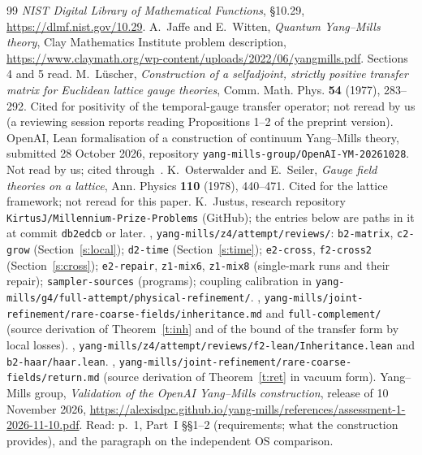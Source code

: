\begin{thebibliography}{99}
 \emph{NIST Digital Library of Mathematical Functions}, \S10.29, \url{https://dlmf.nist.gov/10.29}.
 A.~Jaffe and E.~Witten, \emph{Quantum Yang--Mills theory}, Clay Mathematics Institute problem
description, \url{https://www.claymath.org/wp-content/uploads/2022/06/yangmills.pdf}. Sections 4 and 5 read.
 M.~L\"uscher, \emph{Construction of a selfadjoint, strictly positive transfer matrix for
Euclidean lattice gauge theories}, Comm. Math. Phys. \textbf{54} (1977), 283--292. Cited for positivity of the
temporal-gauge transfer operator; not reread by us (a reviewing session reports reading Propositions 1--2 of
the preprint version).
 OpenAI, Lean formalisation of a construction of continuum Yang--Mills theory, submitted
28 October 2026, repository \texttt{yang-mills-group/OpenAI-YM-20261028}. Not read by us; cited through~\cite{YMG}.
 K.~Osterwalder and E.~Seiler, \emph{Gauge field theories on a lattice}, Ann. Physics
\textbf{110} (1978), 440--471. Cited for the lattice framework; not reread for this paper.
 K.~Justus, research repository \texttt{KirtusJ/Millennium-Prize-Problems} (GitHub); the
entries below are paths in it at commit \texttt{db2edcb} or later.
 \cite{Repo}, \texttt{yang-mills/z4/attempt/reviews/}: \texttt{b2-matrix}, \texttt{c2-grow}
(Section~\ref{s:local}); \texttt{d2-time} (Section~\ref{s:time}); \texttt{e2-cross}, \texttt{f2-cross2}
(Section~\ref{s:cross}); \texttt{e2-repair}, \texttt{z1-mix6}, \texttt{z1-mix8} (single-mark runs and their
repair); \texttt{sampler-sources} (programs); coupling calibration in
\texttt{yang-mills/g4/full-attempt/physical-refinement/}.
 \cite{Repo}, \texttt{yang-mills/joint-refinement/rare-coarse-fields/inheritance.md} and
\texttt{full-complement/} (source derivation of Theorem~\ref{t:inh} and of the bound of the transfer form by
local losses).
 \cite{Repo}, \texttt{yang-mills/z4/attempt/reviews/f2-lean/Inheritance.lean} and
\texttt{b2-haar/haar.lean}.
 \cite{Repo}, \texttt{yang-mills/joint-refinement/rare-coarse-fields/return.md} (source
derivation of Theorem~\ref{t:ret} in vacuum form).
 Yang--Mills group, \emph{Validation of the OpenAI Yang--Mills construction}, release of
10 November 2026, \url{https://alexisdpc.github.io/yang-mills/references/assessment-1-2026-11-10.pdf}. Read:
p.~1, Part~I \S\S1--2 (requirements; what the construction provides), and the paragraph on the independent
OS comparison.
\end{thebibliography}

